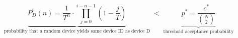 \documentclass{standalone}
\begin{document}
\centering
\begin{minipage}{13cm}
	\[
		\underbrace{
			P_D^i(n)
			=
			\frac{1}{T^n}
			\cdot
			\prod_{j=0}^{i - n - 1}
			\left(1 - \frac{j}{T}\right)
		}_{\text{probability that a random device yields same device ID as device D}}
		\;<\;
		\underbrace{
			p^* = \frac{c^*}{\binom{N}{2}}
		}_{\text{threshold acceptance probability}}
	\]
\end{minipage}
\end{document}
